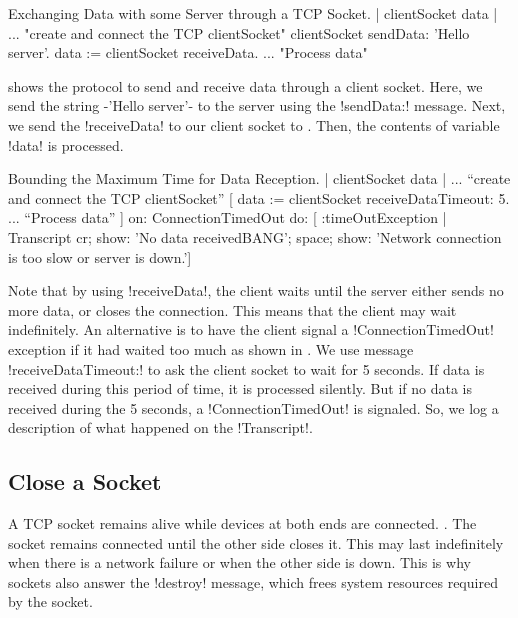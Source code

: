 \documentclass[a4paper,10pt,twoside]{book}
\begin{document}
\begin{script}[dataExhangeWithTcpSocket]{Exchanging Data with some Server through a TCP Socket.}
| clientSocket data |
... "create and connect the TCP clientSocket"
clientSocket sendData: 'Hello server'.
data := clientSocket receiveData.
... "Process data"
\end{script}

 shows the protocol to send and receive data through a client socket.
Here, we send the string \ct-'Hello server'- to the server using the \ct!sendData:! message.
Next, we send the \ct!receiveData! to our client socket to .  Then, the contents of variable \ct!data! is processed.

\begin{script}[dataReceptionTimeOut]{Bounding the Maximum Time for Data Reception.}
| clientSocket data |
... ``create and connect the TCP clientSocket''
[ data := clientSocket receiveDataTimeout: 5.
... ``Process data''
] on: ConnectionTimedOut 
do: [ :timeOutException |
	Transcript 
		cr; 
		show: 'No data receivedBANG';
		space;
		show: 'Network connection is too slow or server is down.']
\end{script}

Note that by using  \ct!receiveData!, the client waits until the server either sends no more data, or closes the connection.
This means that the client may wait indefinitely.
An alternative is to have the client signal a \ct!ConnectionTimedOut! exception if it had waited too much as shown in .
We use message \ct!receiveDataTimeout:! to ask the client socket to wait for 5 seconds.
If data is received during this period of time, it is processed silently.
But if no data is received during the 5 seconds, a \ct!ConnectionTimedOut! is signaled.
So, we log a description of what happened on the \ct!Transcript!.

\subsection{Close a Socket}
A TCP socket remains alive while devices at both ends are connected.
.
The socket remains connected until the other side closes it.
This may last indefinitely when there is a network failure or when the other side is down.
This is why sockets also answer the \ct!destroy! message, which frees system resources required by the socket.
\end{document}
